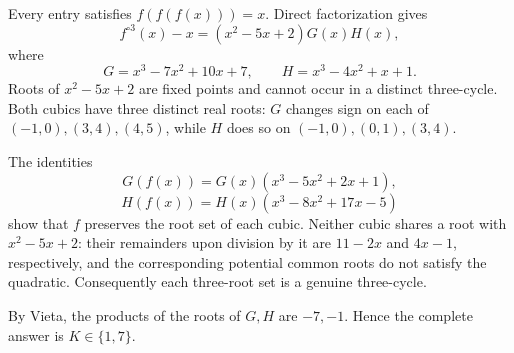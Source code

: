 Every entry satisfies $f(f(f(x)))=x$. Direct factorization gives
\[
f^{\circ3}(x)-x=(x^2-5x+2)G(x)H(x),
\]
where
\[
G=x^3-7x^2+10x+7,\qquad H=x^3-4x^2+x+1.
\]
Roots of $x^2-5x+2$ are fixed points and cannot occur in a distinct three-cycle. Both cubics have three distinct real roots: $G$ changes sign on each of $(-1,0),(3,4),(4,5)$, while $H$ does so on $(-1,0),(0,1),(3,4)$.

The identities
\[
G(f(x))=G(x)(x^3-5x^2+2x+1),
\]
\[
H(f(x))=H(x)(x^3-8x^2+17x-5)
\]
show that $f$ preserves the root set of each cubic. Neither cubic shares a root with $x^2-5x+2$: their remainders upon division by it are $11-2x$ and $4x-1$, respectively, and the corresponding potential common roots do not satisfy the quadratic. Consequently each three-root set is a genuine three-cycle.

By Vieta, the products of the roots of $G,H$ are $-7,-1$. Hence the complete answer is $\boxed{K\in\{1,7\}}$.
